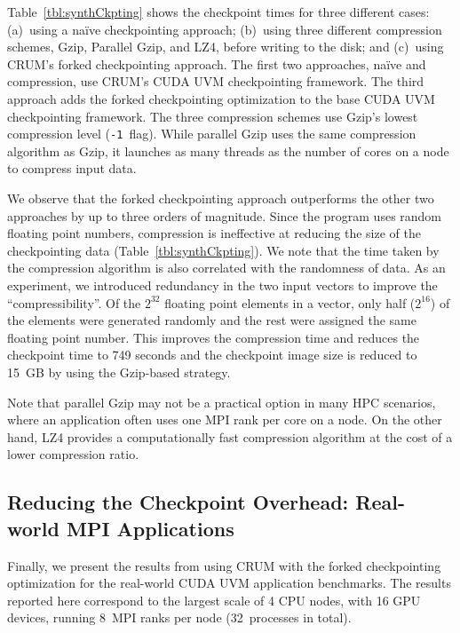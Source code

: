 \documentclass[11pt]{article}
\begin{document}
Table~\ref{tbl:synthCkpting} shows the checkpoint times for three different
cases: (a)~using a na{\"i}ve checkpointing approach; (b)~using three
different compression schemes, Gzip, Parallel Gzip, and LZ4, before
writing to the disk; and (c)~using CRUM's forked checkpointing approach.
The first two approaches, na{\"i}ve and compression, use CRUM's CUDA UVM
checkpointing framework.  The third approach adds the forked checkpointing
optimization to the base CUDA UVM checkpointing framework. The three compression
schemes use Gzip's lowest compression level (\texttt{-1}~flag).
While parallel Gzip
uses the same compression algorithm as Gzip, it launches as many threads as
the number of cores on a node to compress input data.

We observe that the forked checkpointing approach outperforms the other two
approaches by up to three orders of magnitude.  Since the program uses random
floating point numbers, compression is ineffective at reducing the size of
the checkpointing data (Table~\ref{tbl:synthCkpting}). We note that the time
taken by the
compression algorithm is also correlated with the randomness of data. As an
experiment, we introduced redundancy in the two input vectors to improve the
``compressibility''. Of the $2^{32}$ floating point elements in a vector, only
half ($2^{16}$) of the elements were generated randomly and the rest were
assigned the same floating point number. This improves the compression time and
reduces the checkpoint time to 749 seconds and the checkpoint image size is
reduced to 15~GB by using the Gzip-based strategy.

Note that parallel Gzip may not be a practical option in many HPC scenarios,
where an application often uses one MPI rank per core on a node. On the other
hand, LZ4 provides a computationally fast compression algorithm at the cost
of a lower compression ratio.

\subsection{Reducing the Checkpoint Overhead:  Real-world MPI Applications}

Finally, we present the results from using CRUM with the forked checkpointing
optimization for the real-world CUDA UVM application benchmarks. The results
reported
here correspond to the largest scale of 4 CPU nodes, with 16 GPU devices,
running 8~MPI ranks per node (32~processes in total).
\end{document}
